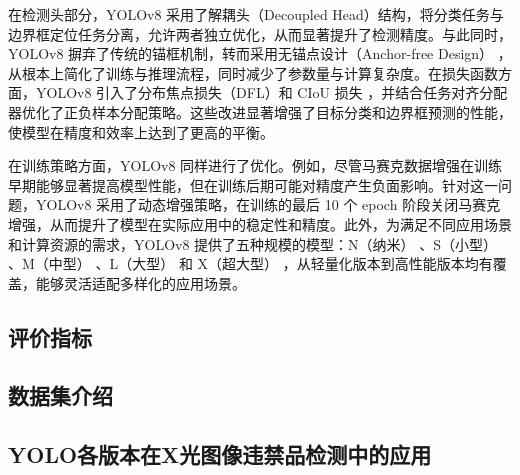 \documentclass[11pt,twocolumn]{ctexart}
\begin{document}
在检测头部分，YOLOv8 采用了解耦头（Decoupled Head）结构，将分类任务与边界框定位任务分离，允许两者独立优化，从而显著提升了检测精度。与此同时，YOLOv8 摒弃了传统的锚框机制，转而采用无锚点设计（Anchor-free Design） ，从根本上简化了训练与推理流程，同时减少了参数量与计算复杂度。在损失函数方面，YOLOv8 引入了分布焦点损失（DFL）和 CIoU 损失 ，并结合任务对齐分配器优化了正负样本分配策略。这些改进显著增强了目标分类和边界框预测的性能，使模型在精度和效率上达到了更高的平衡。

在训练策略方面，YOLOv8 同样进行了优化。例如，尽管马赛克数据增强在训练早期能够显著提高模型性能，但在训练后期可能对精度产生负面影响。针对这一问题，YOLOv8 采用了动态增强策略，在训练的最后 10 个 epoch 阶段关闭马赛克增强，从而提升了模型在实际应用中的稳定性和精度。此外，为满足不同应用场景和计算资源的需求，YOLOv8 提供了五种规模的模型：N（纳米） 、S（小型） 、M（中型） 、L（大型） 和 X（超大型） ，从轻量化版本到高性能版本均有覆盖，能够灵活适配多样化的应用场景。

%


\subsection{评价指标}
\subsection{数据集介绍}
\subsection{YOLO各版本在X光图像违禁品检测中的应用}





\end{document}
